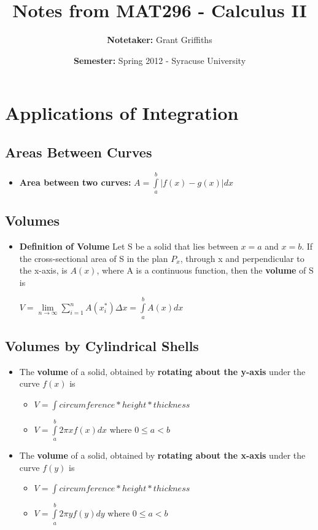 \documentclass{report}
\title{\textbf{Notes from MAT296 - Calculus II}}
\author{\textbf{Notetaker: }Grant Griffiths}
\date{\textbf{Semester: }Spring 2012 - Syracuse University}
\begin{document}
   \maketitle
   \tableofcontents 
\chapter{Applications of Integration}
	\section{Areas Between Curves}
		\begin{itemize}\addtolength{\leftskip}{2em}
			\item \textbf{Area between two curves:} \large$A=\int\limits_{a}^{b}|f(x)-g(x)|dx$
		\end{itemize}
	\section{Volumes}
		\begin{itemize}\addtolength{\leftskip}{2em}
			\item \textbf{Definition of Volume} Let S be a solid that lies between $x=a$ and $x=b$. If the cross-sectional area of S in the plan $P_x$, through x and perpendicular to the x-axis, is $A(x)$, where A is a continuous function, then the \textbf{volume} of S is 
			\begin{center}
			\large$V=\lim\limits_{n\rightarrow \infty}\sum\limits_{i=1}^{n}A(x_i^*)\Delta x=\int\limits_{a}^{b}A(x)dx$
			\end{center}
		\end{itemize}
	\section{Volumes by Cylindrical Shells}
		\begin{itemize}\addtolength{\leftskip}{2em}
			\item The \textbf{volume} of a solid, obtained by \textbf{rotating about the y-axis} under the curve $f(x)$ is 
				\begin{itemize}\addtolength{\leftskip}{4em}
					\item \large$V=\int circumference * height * thickness$
					\item \large$V=\int\limits_{a}^{b}2\pi xf(x)dx$   where $0\le a<b$
				\end{itemize}	
			\item The\textbf{ volume} of a solid, obtained by \textbf{rotating about the x-axis} under the curve $f(y)$ is 
				\begin{itemize}\addtolength{\leftskip}{4em}
					\item \large$V=\int circumference * height * thickness$
					\item \large$V=\int\limits_{a}^{b}2\pi yf(y)dy$   where $0\le a<b$
				\end{itemize}
		\end{itemize}
\end{document}
